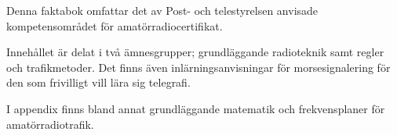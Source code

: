 Denna faktabok omfattar det av Post- och telestyrelsen anvisade
kompetensområdet för amatörradiocertifikat.

Innehållet är delat i två ämnesgrupper; grundläggande radioteknik
samt regler och trafikmetoder.
Det finns även inlärningsanvisningar för morsesignalering för den
som frivilligt vill lära sig telegrafi.

I appendix finns bland annat grundläggande matematik
och frekvensplaner för amatörradiotrafik.
